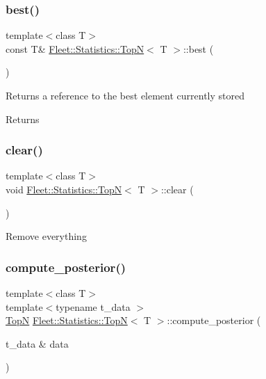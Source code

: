 \subsubsection{\texorpdfstring{best()}{best()}}
{\footnotesize\ttfamily template$<$class T$>$ \\
const T\& \hyperlink{class_fleet_1_1_statistics_1_1_top_n}{Fleet\+::\+Statistics\+::\+TopN}$<$ T $>$\+::best (\begin{DoxyParamCaption}{ }\end{DoxyParamCaption})\hspace{0.3cm}{\ttfamily [inline]}}

Returns a reference to the best element currently stored \begin{DoxyReturn}{Returns}

\end{DoxyReturn}
\mbox{\label{class_fleet_1_1_statistics_1_1_top_n_ab57188b1858802dcf1f26dbcf702c6ae}} 
\subsubsection{\texorpdfstring{clear()}{clear()}}
{\footnotesize\ttfamily template$<$class T$>$ \\
void \hyperlink{class_fleet_1_1_statistics_1_1_top_n}{Fleet\+::\+Statistics\+::\+TopN}$<$ T $>$\+::clear (\begin{DoxyParamCaption}{ }\end{DoxyParamCaption})\hspace{0.3cm}{\ttfamily [inline]}}

Remove everything\mbox{\label{class_fleet_1_1_statistics_1_1_top_n_ac6ab403d6833e58352e24110ee379fbf}} 
\subsubsection{\texorpdfstring{compute\+\_\+posterior()}{compute\_posterior()}}
{\footnotesize\ttfamily template$<$class T$>$ \\
template$<$typename t\+\_\+data $>$ \\
\hyperlink{class_fleet_1_1_statistics_1_1_top_n}{TopN} \hyperlink{class_fleet_1_1_statistics_1_1_top_n}{Fleet\+::\+Statistics\+::\+TopN}$<$ T $>$\+::compute\+\_\+posterior (\begin{DoxyParamCaption}\item[{t\+\_\+data \&}]{data }\end{DoxyParamCaption})\hspace{0.3cm}{\ttfamily [inline]}}


